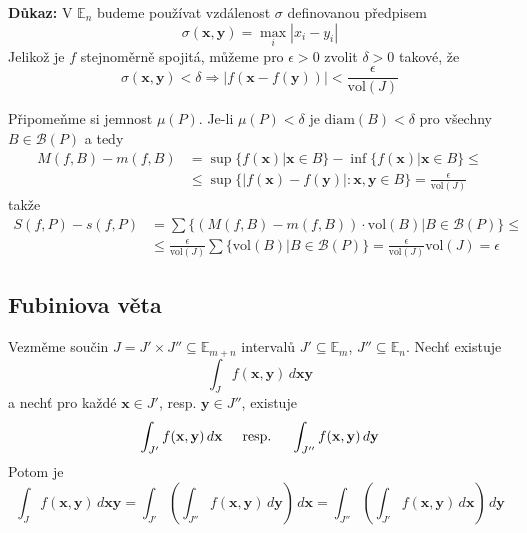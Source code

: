 \documentclass[../main.tex]{subfiles}
\begin{document}
\vspace{5mm}
\noindent
\textbf{Důkaz:}
V $\mathbb{E}_n$ budeme používat vzdálenost $\sigma$ definovanou předpisem
\[ \sigma (\mathbf{x}, \mathbf{y}) = \max_{i} |x_i - y_i| \]
Jelikož je $f$ stejnoměrně spojitá, můžeme pro $\epsilon > 0$ zvolit $\delta > 0$ takové, že
\[ \sigma (\mathbf{x}, \mathbf{y}) < \delta \Rightarrow
|f(\mathbf{x} - f(\mathbf{y}))| < \frac{\epsilon}{\textrm{vol}(J)} \]

\noindent
\hspace{1.2mm}
Připomeňme si jemnost $\mu (P)$. Je-li $\mu (P) < \delta$ je $\textrm{diam}(B) < \delta$ pro všechny
$ B \in \mathcal{B}(P) $ a tedy
\begin{align*}
    M(f, B) - m(f, B) &= \sup\{ f(\mathbf{x})|\mathbf{x} \in B \} -
    \inf\{ f(\mathbf{x})|\mathbf{x} \in B\}\leq\\
    &\leq \sup\{ |f(\mathbf{x}) - f(\mathbf{y})|: \mathbf{x}, \mathbf{y} \in B \}
    = \frac{\epsilon}{\textrm{vol}(J)}
\end{align*}
takže
\begin{align*}
    S(f,P) - s(f,P) &= \sum \{ (M(f,B) - m(f,B))\cdot \textrm{vol}(B)|B\in \mathcal{B}(P) \}\leq\\
    &\leq \frac{\epsilon}{\textrm{vol}(J)}\sum \{ \textrm{vol}(B)| B\in \mathcal{B}(P) \}
    = \frac{\epsilon}{\textrm{vol}(J)}\textrm{vol}(J) = \epsilon
\end{align*}

\subsection{Fubiniova věta}
\hspace{1.2mm}
Vezměme součin $J = J' \times J'' \subseteq \mathbb{E}_{m+n}$ intervalů $J' \subseteq \mathbb{E}_m$,
$J'' \subseteq \mathbb{E}_n$. Nechť existuje
\[ \int_{J} f(\mathbf{x}, \mathbf{y}) \,d\mathbf{xy} \]
a nechť pro každé $\mathbf{x} \in J'$, resp. $\mathbf{y} \in J''$, existuje
\[ \int_{J'} f(\mathbf{x}, \mathbf{y}) \,d\mathbf{x}
\hspace{5mm}\textrm{resp.}\hspace{5mm}
\int_{J''} f(\mathbf{x}, \mathbf{y}) \,d\mathbf{y} \]
Potom je
\[ \int_J f(\mathbf{x}, \mathbf{y}) \,d\mathbf{xy} =
\int_{J'} \left( \int_{J''} f(\mathbf{x}, \mathbf{y}) \,d\mathbf{y} \right) \,d\mathbf{x} = 
\int_{J''} \left( \int_{J'} f(\mathbf{x}, \mathbf{y}) \,d\mathbf{x} \right) \,d\mathbf{y}\]
\end{document}
